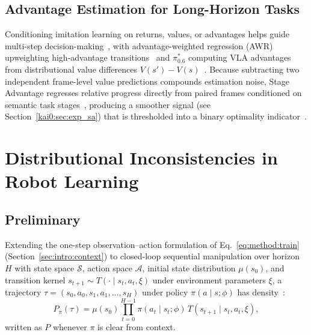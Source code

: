\subsection{Advantage Estimation for Long-Horizon Tasks}\label{kai0:sec:related_adv}
Conditioning imitation learning on returns, values, or advantages helps guide multi-step decision-making~\cite{schmidhuber2019reinforcement,zheng2022online,emmons2022rvs,kuba2023advantage,wu2023elastic}, with advantage-weighted regression (AWR) upweighting high-advantage transitions~\cite{peng2019awr} and $\pi^{*}_{0.6}$ computing VLA advantages from distributional value differences $V(s') - V(s)$~\cite{amin2026pistar06}. Because subtracting two independent frame-level value predictions compounds estimation noise, Stage Advantage regresses relative progress directly from paired frames conditioned on semantic task stages~\cite{sima2026kai0}, producing a smoother signal (see Section~\ref{kai0:sec:exp_sa}) that is thresholded into a binary optimality indicator~\cite{amin2026pistar06}.

\section{Distributional Inconsistencies in Robot Learning}\label{kai0:sec:problem}

\subsection{Preliminary}\label{kai0:sec:prelim}
Extending the one-step observation--action formulation of Eq.~\eqref{eq:method:train} (Section~\ref{sec:intro:context}) to closed-loop sequential manipulation over horizon $H$ with state space $\mathcal{S}$, action space $\mathcal{A}$, initial state distribution $\mu(s_0)$, and transition kernel $s_{t+1} \sim T(\cdot \mid s_t, a_t, \xi)$ under environment parameters $\xi$, a trajectory $\tau = (s_0, a_0, s_1, a_1, \dots, s_H)$ under policy $\pi(a \mid s; \phi)$ has density~\cite{schulman2015trust,levine2018reinforcement}:
\begin{equation}
  P_{\pi}(\tau) = \mu(s_0) \prod_{t=0}^{H-1} \pi(a_t \mid s_t; \phi)\, T(s_{t+1} \mid s_t, a_t, \xi),
  \label{kai0:eq:traj_distrib}
\end{equation}
written as $P$ whenever $\pi$ is clear from context.

